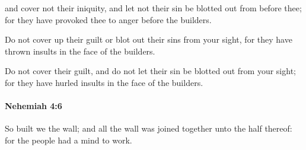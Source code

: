 			\begin{versebox}
					\item[BHS] 
					\item[LXX] 
					\item[ASV] and cover not their iniquity, and let not their sin be blotted out from before thee; for they have provoked thee to anger before the builders.
					\item[NIV] Do not cover up their guilt or blot out their sins from your sight, for they have thrown insults in the face of the builders.
					\item[NRSV] Do not cover their guilt, and do not let their sin be blotted out from your sight; for they have hurled insults in the face of the builders.
			\end{versebox}

		\paragraph{Nehemiah 4:6} %
			\label{NEHEMIAH-4-6}

			So built we the wall; and all the wall was joined together unto the half thereof: for the people had a mind to work.

